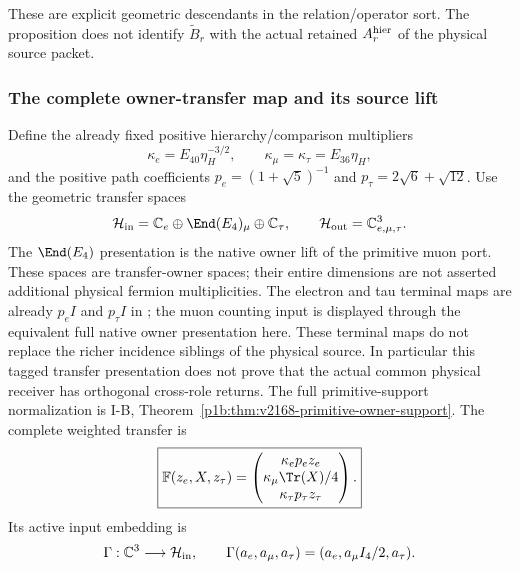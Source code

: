 \documentclass[12pt,a4paper]{article}
\begin{document}
These are explicit geometric descendants in the relation/operator sort.
The proposition does not identify $\widetilde B_r$ with the actual retained
$A_r^{\rm hier}$ of the physical source packet.

\subsubsection{The complete owner-transfer map and its source lift}
Define the already fixed positive hierarchy/comparison multipliers
\[
 \kappa_e=E_{40}\eta_H^{-3/2},\qquad
 \kappa_\mu=\kappa_\tau=E_{36}\eta_H,
\]
and the positive path coefficients
$p_e=(1+\sqrt5)^{-1}$ and $p_\tau=2\sqrt6+\sqrt{12}$.
Use the geometric transfer spaces
\[
 \mathcal H_{\rm in}=\mathbb C_e\oplus\End(E_4)_\mu\oplus\mathbb C_\tau,
 \qquad \mathcal H_{\rm out}=\mathbb C^3_{e,\mu,\tau}.
\]
The $\End(E_4)$ presentation is the native owner lift of the primitive muon
port. These spaces are transfer-owner spaces; their entire dimensions are
not asserted additional physical fermion multiplicities.
The electron and tau terminal maps are already $p_eI$ and $p_\tau I$ in
; the muon counting input
is displayed through the equivalent full native owner presentation here. These terminal maps
do not replace the richer incidence siblings of the physical source.
In particular this tagged transfer presentation does not prove that the
actual common physical receiver has orthogonal cross-role returns.
The full primitive-support normalization is I-B, Theorem~\ref{p1b:thm:v2168-primitive-owner-support}. The complete weighted transfer is
\[
 \boxed{\mathbb F(z_e,X,z_\tau)=
 \begin{pmatrix}
 \kappa_ep_e z_e\\
 \kappa_\mu\Tr(X)/4\\
 \kappa_\tau p_\tau z_\tau
 \end{pmatrix}.}
\]
Its active input embedding is
\[
 \Gamma:\mathbb C^3\longrightarrow\mathcal H_{\rm in},\qquad
 \Gamma(a_e,a_\mu,a_\tau)=(a_e,a_\mu I_4/2,a_\tau).
\]
\end{document}
